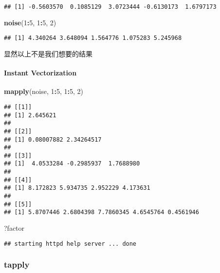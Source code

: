 \documentclass[
]{article}
\newenvironment{Shaded}{\begin{snugshade}}{\end{snugshade}}
\newcommand{\DecValTok}[1]{\textcolor[rgb]{0.00,0.00,0.81}{#1}}
\newcommand{\KeywordTok}[1]{\textcolor[rgb]{0.13,0.29,0.53}{\textbf{#1}}}
\newcommand{\NormalTok}[1]{#1}
\newcommand{\OperatorTok}[1]{\textcolor[rgb]{0.81,0.36,0.00}{\textbf{#1}}}
\begin{document}
\begin{verbatim}
## [1] -0.5603570  0.1085129  3.0723444 -0.6130173  1.6797173
\end{verbatim}

\begin{Shaded}
\begin{Highlighting}[]
\KeywordTok{noise}\NormalTok{(}\DecValTok{1}\OperatorTok{:}\DecValTok{5}\NormalTok{, }\DecValTok{1}\OperatorTok{:}\DecValTok{5}\NormalTok{, }\DecValTok{2}\NormalTok{)}
\end{Highlighting}
\end{Shaded}

\begin{verbatim}
## [1] 4.340264 3.648094 1.564776 1.075283 5.245968
\end{verbatim}

显然以上不是我们想要的结果

\hypertarget{instant-vectorization}{%
\paragraph{Instant Vectorization}\label{instant-vectorization}}

\begin{Shaded}
\begin{Highlighting}[]
\KeywordTok{mapply}\NormalTok{(noise, }\DecValTok{1}\OperatorTok{:}\DecValTok{5}\NormalTok{, }\DecValTok{1}\OperatorTok{:}\DecValTok{5}\NormalTok{, }\DecValTok{2}\NormalTok{)}
\end{Highlighting}
\end{Shaded}

\begin{verbatim}
## [[1]]
## [1] 2.645621
## 
## [[2]]
## [1] 0.08007882 2.34264517
## 
## [[3]]
## [1]  4.0533284 -0.2985937  1.7688980
## 
## [[4]]
## [1] 8.172823 5.934735 2.952229 4.173631
## 
## [[5]]
## [1] 5.8707446 2.6804398 7.7860345 4.6545764 0.4561946
\end{verbatim}

\begin{Shaded}
\begin{Highlighting}[]
\NormalTok{?factor}
\end{Highlighting}
\end{Shaded}

\begin{verbatim}
## starting httpd help server ... done
\end{verbatim}

\hypertarget{tapply}{%
\subsubsection{tapply}\label{tapply}}
\end{document}
